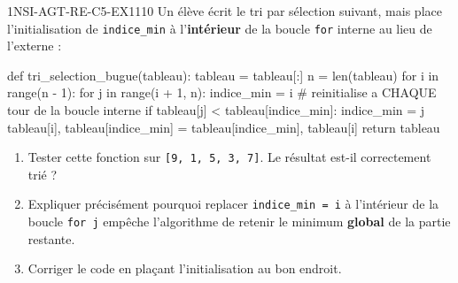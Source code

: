 

\begin{exercice}{1NSI-AGT-RE-C5-EX1}{1}{10}
Un élève écrit le tri par sélection suivant, mais place l'initialisation de
\lstinline{indice_min} à l'\textbf{intérieur} de la boucle \lstinline{for} interne au lieu
de l'externe :
\begin{python}
def tri_selection_bugue(tableau):
    tableau = tableau[:]
    n = len(tableau)
    for i in range(n - 1):
        for j in range(i + 1, n):
            indice_min = i  # reinitialise a CHAQUE tour de la boucle interne
            if tableau[j] < tableau[indice_min]:
                indice_min = j
        tableau[i], tableau[indice_min] = tableau[indice_min], tableau[i]
    return tableau
\end{python}
\begin{enumerate}
  \item Tester cette fonction sur \lstinline{[9, 1, 5, 3, 7]}. Le résultat est-il correctement trié ?
  \item Expliquer précisément pourquoi replacer \lstinline{indice_min = i} à l'intérieur de la boucle \lstinline{for j} empêche l'algorithme de retenir le minimum \textbf{global} de la partie restante.
  \item Corriger le code en plaçant l'initialisation au bon endroit.
\end{enumerate}
\end{exercice}

